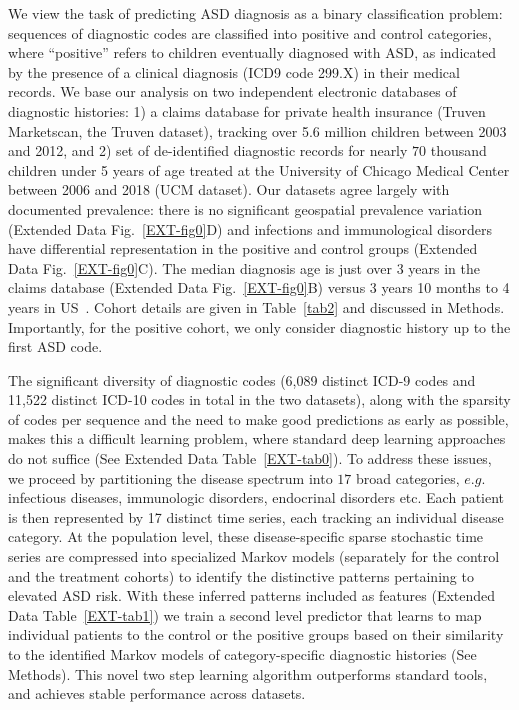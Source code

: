 \documentclass[3p,super,numbers,sort&compress,preprint,10pt]{elsarticle}
\def\treatment{positive\xspace}
\begin{document}
We view the task of predicting  ASD diagnosis   as a binary classification problem: sequences of diagnostic codes are classified into positive and control categories, where ``positive'' refers to children eventually diagnosed with ASD, as indicated by the presence of a clinical diagnosis (ICD9 code 299.X) in their medical records.
We base our analysis on two independent  electronic databases of  diagnostic histories: 1)  a  claims database for private health insurance (Truven Marketscan, the Truven dataset), tracking over 5.6 million children between  2003 and 2012, and 2) set of  de-identified diagnostic records  for nearly $70$ thousand children under 5 years of age treated at the  University of Chicago Medical Center between 2006 and 2018 (UCM dataset). Our datasets agree largely  with documented prevalence: there is no significant geospatial prevalence variation (Extended Data Fig.~\ref{EXT-fig0}D) and   infections and immunological disorders have differential representation in the \treatment and control groups (Extended Data Fig.~\ref{EXT-fig0}C).  The  median diagnosis age is  just over  3 years in the claims database (Extended Data Fig.~\ref{EXT-fig0}B)  versus 3 years 10 months to 4 years  in US~\cite{pmid29701730}. Cohort details are given in Table~\ref{tab2} and discussed in Methods. Importantly, for the positive cohort, we only consider diagnostic history up to the first ASD code.

The significant diversity of diagnostic codes (6,089 distinct ICD-9 codes and 11,522 distinct ICD-10 codes in total in the two datasets), along with the sparsity of codes per sequence and the need to make good predictions as early as possible,  makes this a difficult learning problem, where standard deep learning approaches do not suffice (See Extended Data Table~\ref{EXT-tab0}). To address these issues, we proceed by  partitioning the  disease spectrum into $17 $ broad categories, $e.g.$ infectious diseases, immunologic disorders, endocrinal disorders etc. Each patient is then represented by 17 distinct time series, each  tracking an individual disease category. At the population level, these disease-specific sparse stochastic time series are  compressed into specialized Markov models (separately for the control and the treatment cohorts) to identify  the distinctive patterns  pertaining to elevated ASD risk. With these inferred patterns included as features (Extended Data Table~\ref{EXT-tab1}) we train a second level predictor that learns to map   individual patients  to the control or the \treatment groups based on their  similarity  to the identified  Markov models of category-specific diagnostic histories (See Methods). This novel two step learning algorithm outperforms standard tools, and achieves  stable performance across datasets.
\end{document}
